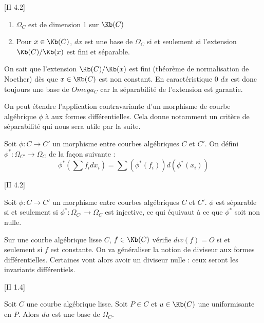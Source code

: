 \begin{Prop}\cite{Sil09}[II 4.2]
	
	\begin{enumerate}
		\item $\Omega_{C}$ est de dimension 1 sur $\Kb(C)$
		\item Pour $x \in \Kb(C)$, $dx$ est une base de $\Omega_{C}$ si et seulement si l'extension $\Kb(C) / \Kb(x)$ est fini et séparable. 
	\end{enumerate}
\end{Prop}


\begin{Rem} On sait que l'extension $\Kb(C) / \Kb(x)$ est fini (théorème de normalisation de Noether) dès que $x\in\Kb(C)$ est non constant. En caractéristique 0 $dx$ est donc toujours une base de $Omega_{C}$ car la séparabilité de l'extension est garantie. 
\end{Rem}

On peut étendre l'application contravariante d'un morphisme de courbe algébrique $\phi$ à aux formes différentielles. Cela donne notamment un critère de séparabilité qui nous sera utile par la suite.

\begin{Def}
	Soit $\phi : C \rightarrow C'$ un morphisme entre courbes algébriques $C$ et $C'$. On défini $\phi^{*} : \Omega_{C'} \rightarrow \Omega_{C}$ de la façon suivante :
	\begin{equation*}
		\phi^{*}\left(\sum f_idx_i \right) = \sum \left( \phi^{*}(f_i) \right) d\left( \phi^{*}(x_i)\right) 
	\end{equation*}
\end{Def}

\begin{Prop}\cite{Sil09}[II 4.2]
	
	Soit $\phi : C \rightarrow C'$ un morphisme entre courbes algébriques $C$ et $C'$. $\phi$ est séparable si et seulement si $\phi^{*} : \Omega_{C'} \rightarrow \Omega_{C}$ est injective, ce qui équivaut à ce que $\phi^{*}$ soit non nulle. 
\end{Prop}

Sur une courbe algébrique lisse $C$, $f\in\Kb(C)$ vérifie $div(f) = O$ si et seulement si $f$ est constante. On va généraliser la notion de diviseur aux formes différentielles. Certaines vont alors avoir un diviseur nulle : ceux seront les invariants différentiels. 

\begin{Prop}\cite{Sil09}[II 1.4]
	
	Soit $C$ une courbe algébrique lisse. Soit $P\in C$ et $u\in \Kb(C)$ une uniformisante en $P$. Alors $du$ est une base de $\Omega_{C}$. 
\end{Prop}

